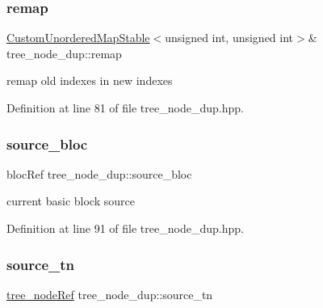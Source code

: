\subsubsection{\texorpdfstring{remap}{remap}}
{\footnotesize\ttfamily \hyperlink{custom__map_8hpp_a7314a7df1cdb3a3acf478ab86e95c226}{Custom\+Unordered\+Map\+Stable}$<$unsigned int, unsigned int$>$\& tree\+\_\+node\+\_\+dup\+::remap\hspace{0.3cm}{\ttfamily [private]}}



remap old indexes in new indexes 



Definition at line 81 of file tree\+\_\+node\+\_\+dup.\+hpp.

\mbox{\label{structtree__node__dup_a630ad8c68077769d7a4965c7a0eb64ea}} 
\subsubsection{\texorpdfstring{source\+\_\+bloc}{source\_bloc}}
{\footnotesize\ttfamily bloc\+Ref tree\+\_\+node\+\_\+dup\+::source\+\_\+bloc\hspace{0.3cm}{\ttfamily [private]}}



current basic block source 



Definition at line 91 of file tree\+\_\+node\+\_\+dup.\+hpp.

\mbox{\label{structtree__node__dup_a1a1e82473bea3953d902dcf5aea0c0fa}} 
\subsubsection{\texorpdfstring{source\+\_\+tn}{source\_tn}}
{\footnotesize\ttfamily \hyperlink{tree__node_8hpp_a6ee377554d1c4871ad66a337eaa67fd5}{tree\+\_\+node\+Ref} tree\+\_\+node\+\_\+dup\+::source\+\_\+tn\hspace{0.3cm}{\ttfamily [private]}}



